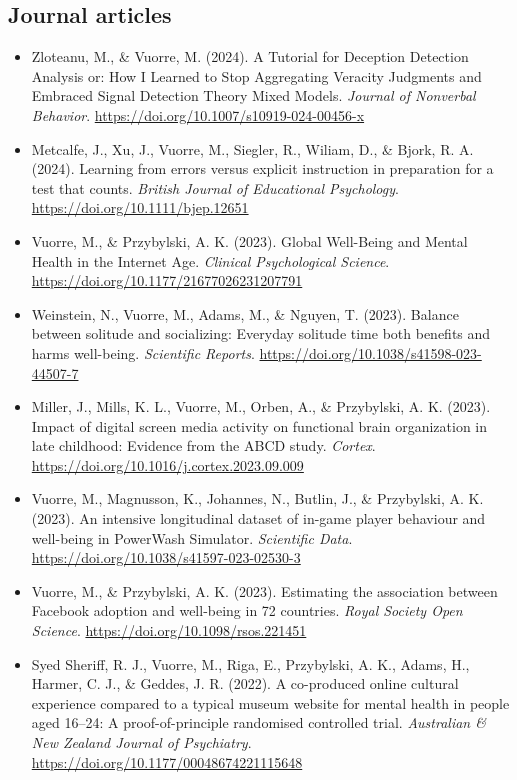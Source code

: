 \documentclass[12pt, a4paper]{article}
\newcommand{\years}[1]{\marginnote{\scriptsize #1}}
\begin{document}
\subsection*{Journal articles}
\begin{itemize}
  \item \years{2024} Zloteanu, M., \& Vuorre, M. (2024). A Tutorial for Deception Detection Analysis or: How I Learned to Stop Aggregating Veracity Judgments and Embraced Signal Detection Theory Mixed Models. \emph{Journal of Nonverbal Behavior}. \url{https://doi.org/10.1007/s10919-024-00456-x}
  \item Metcalfe, J., Xu, J., Vuorre, M., Siegler, R., Wiliam, D., \& Bjork, R. A. (2024). Learning from errors versus explicit instruction in preparation for a test that counts. \emph{British Journal of Educational Psychology}. \url{https://doi.org/10.1111/bjep.12651}
  \item \years{2023} Vuorre, M., \& Przybylski, A. K. (2023). Global Well-Being and Mental Health in the Internet Age. \emph{Clinical Psychological Science}. \url{https://doi.org/10.1177/21677026231207791}
  \item Weinstein, N., Vuorre, M., Adams, M., \& Nguyen, T. (2023). Balance between solitude and socializing: Everyday solitude time both benefits and harms well-being. \emph{Scientific Reports}. \url{https://doi.org/10.1038/s41598-023-44507-7}
  \item Miller, J., Mills, K. L., Vuorre, M., Orben, A., \& Przybylski, A. K. (2023). Impact of digital screen media activity on functional brain organization in late childhood: Evidence from the ABCD study. \emph{Cortex}. \url{https://doi.org/10.1016/j.cortex.2023.09.009}
  \item Vuorre, M., Magnusson, K., Johannes, N., Butlin, J., \& Przybylski, A. K. (2023). An intensive longitudinal dataset of in-game player behaviour and well-being in PowerWash Simulator. \emph{Scientific Data}. \url{https://doi.org/10.1038/s41597-023-02530-3}
  \item Vuorre, M., \& Przybylski, A. K. (2023). Estimating the association between Facebook adoption and well-being in 72 countries. \emph{Royal Society Open Science}. \url{https://doi.org/10.1098/rsos.221451}
  \item \years{2022} Syed Sheriff, R. J., Vuorre, M., Riga, E., Przybylski, A. K., Adams, H., Harmer, C. J., \& Geddes, J. R. (2022). A co-produced online cultural experience compared to a typical museum website for mental health in people aged 16–24: A proof-of-principle randomised controlled trial. \emph{Australian \& New Zealand Journal of Psychiatry}. \url{https://doi.org/10.1177/00048674221115648}

\end{itemize}
\end{document}
